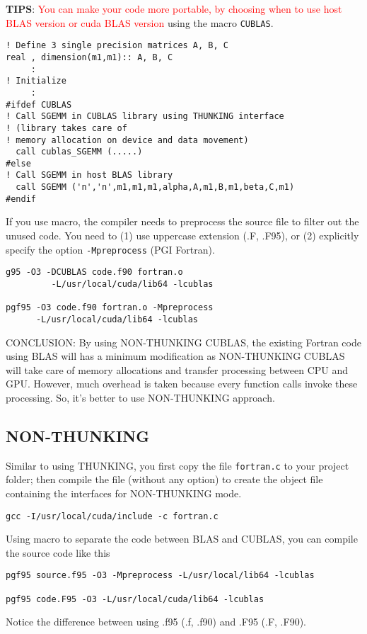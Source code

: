{\bf TIPS}:
\textcolor{red}{You can make your code more portable, by choosing when
  to use host BLAS version or cuda BLAS version}
using the macro \verb!CUBLAS!.
\begin{lstlisting}
! Define 3 single precision matrices A, B, C
real , dimension(m1,m1):: A, B, C
     :
! Initialize
     :
#ifdef CUBLAS
! Call SGEMM in CUBLAS library using THUNKING interface 
! (library takes care of
! memory allocation on device and data movement)
  call cublas_SGEMM (.....)
#else
! Call SGEMM in host BLAS library
  call SGEMM ('n','n',m1,m1,m1,alpha,A,m1,B,m1,beta,C,m1)
#endif
\end{lstlisting}
If you use macro, the compiler needs to preprocess the source file to
filter out the unused code. You need to (1) use uppercase extension
(.F, .F95), or (2) explicitly specify the option \verb!-Mpreprocess!
(PGI Fortran). 
\begin{lstlisting}
g95 -O3 -DCUBLAS code.f90 fortran.o 
         -L/usr/local/cuda/lib64 -lcublas

pgf95 -O3 code.f90 fortran.o -Mpreprocess 
      -L/usr/local/cuda/lib64 -lcublas  
\end{lstlisting}


CONCLUSION: By using NON-THUNKING CUBLAS, the existing Fortran code
using BLAS will has a minimum modification as NON-THUNKING CUBLAS will
take care of memory allocations and transfer processing between CPU
and GPU.  However, much overhead is taken because every function calls
invoke these processing. So, it's better to use NON-THUNKING approach.


\subsection{NON-THUNKING}
\label{sec:non-thunking}

Similar to using THUNKING, you first copy the file \verb!fortran.c! to
your project folder; then compile the file (without any option) to
create the object file containing the interfaces for NON-THUNKING
mode.
\begin{verbatim}
gcc -I/usr/local/cuda/include -c fortran.c
\end{verbatim}

Using macro to separate the code between BLAS and CUBLAS, you can
compile the source code like this
\begin{lstlisting}
pgf95 source.f95 -O3 -Mpreprocess -L/usr/local/lib64 -lcublas

pgf95 code.F95 -O3 -L/usr/local/cuda/lib64 -lcublas
\end{lstlisting}
Notice the difference between using .f95 (.f, .f90) and .F95 (.F, .F90).

